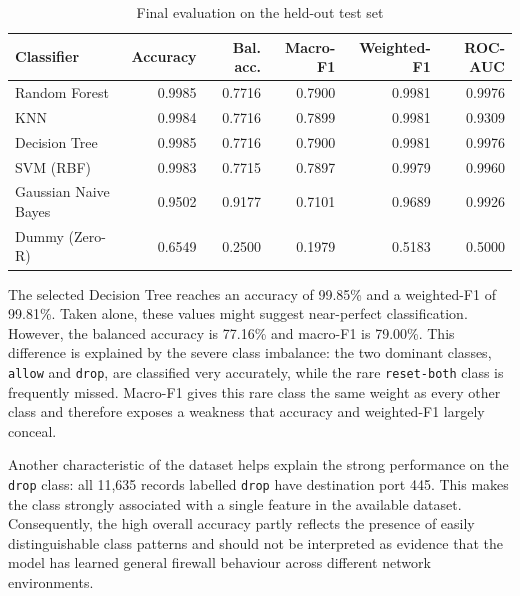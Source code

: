 \begin{table}[htbp]
  \centering
  \caption{Final evaluation on the held-out test set}
  \label{tab:test-comparison}
  \small
  \begin{tabular}{|l|r|r|r|r|r|}
    \hline
    \textbf{Classifier} & \textbf{Accuracy} & \textbf{Bal. acc.} & \textbf{Macro-F1} & \textbf{Weighted-F1} & \textbf{ROC-AUC} \\
    \hline
    Random Forest & 0.9985 & 0.7716 & 0.7900 & 0.9981 & 0.9976 \\
    KNN & 0.9984 & 0.7716 & 0.7899 & 0.9981 & 0.9309 \\
    Decision Tree & 0.9985 & 0.7716 & 0.7900 & 0.9981 & 0.9976 \\
    SVM (RBF) & 0.9983 & 0.7715 & 0.7897 & 0.9979 & 0.9960 \\
    Gaussian Naive Bayes & 0.9502 & 0.9177 & 0.7101 & 0.9689 & 0.9926 \\
    Dummy (Zero-R) & 0.6549 & 0.2500 & 0.1979 & 0.5183 & 0.5000 \\
    \hline
  \end{tabular}
\end{table}

The selected Decision Tree reaches an accuracy of 99.85\% and a weighted-F1 of 99.81\%. Taken alone, these values might suggest near-perfect classification. However, the balanced accuracy is 77.16\% and macro-F1 is 79.00\%. This difference is explained by the severe class imbalance: the two dominant classes, \texttt{allow} and \texttt{drop}, are classified very accurately, while the rare \texttt{reset-both} class is frequently missed. Macro-F1 gives this rare class the same weight as every other class and therefore exposes a weakness that accuracy and weighted-F1 largely conceal.

Another characteristic of the dataset helps explain the strong performance on the \texttt{drop} class: all 11,635 records labelled \texttt{drop} have destination port 445. This makes the class strongly associated with a single feature in the available dataset. Consequently, the high overall accuracy partly reflects the presence of easily distinguishable class patterns and should not be interpreted as evidence that the model has learned general firewall behaviour across different network environments.

